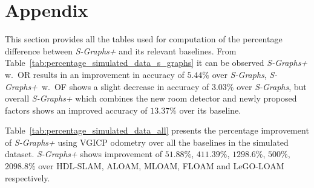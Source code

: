 \section{Appendix}

This section provides all the tables used for computation of the percentage difference between \textit{S-Graphs+} and its relevant baselines. From Table~\ref{tab:percentage_simulated_data_s_graphs} it can be observed \textit{S-Graphs+} \mbox{w. OR} results in an improvement in accuracy of $5.44\%$ over \textit{S-Graphs}, \mbox{\textit{S-Graphs+} w. OF} shows a slight decrease in accuracy of $3.03\%$ over \textit{S-Graphs}, but overall  \textit{S-Graphs+} which combines the new room detector and newly proposed factors shows an improved accuracy of $13.37\%$ over its baseline. 

Table~\ref{tab:percentage_simulated_data_all} presents the percentage improvement of \textit{S-Graphs+} using VGICP odometry over all the baselines in the simulated dataset. \textit{S-Graphs+} shows improvement of $51.88\%$, $411.39\%$, $1298.6\%$, $500\%$, $2098.8\%$ over HDL-SLAM, ALOAM, MLOAM, FLOAM and LeGO-LOAM respectively.  


